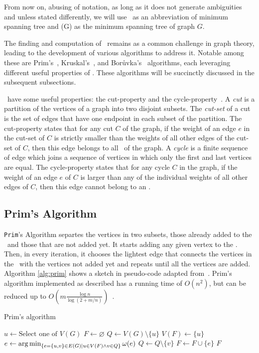 From now on, abusing of notation, as long as it does not generate ambiguities and unless stated differently, we will use \mst\ as an abbreviation of minimum spanning tree and \mst(G) as the minimum spanning tree of graph $G$.

The finding and computation of \msts\ remains as a common challenge in graph theory, leading to the development of various algorithms to address it. Notable among these are Prim's~\cite{Prim1957}, Kruskal's~\cite{Kruskal1956}, and Bor\r{u}vka's~\cite{Boruvka1926} algorithms, each leveraging different useful properties of \msts. These algorithms will be succinctly discussed in the subsequent subsections.

\msts\ have some useful properties: the cut-property and the cycle-property~\cite{TarjanDSandNA}. A \textit{cut} is a partition of the vertices of a graph into two disjoint subsets. The \textit{cut-set} of a cut is the set of edges that have one endpoint in each subset of the partition. The cut-property states that for any cut $C$ of the graph, if the weight of an edge $e$ in the cut-set of $C$ is strictly smaller than the weights of all other edges of the cut-set of $C$, then this edge belongs to all \msts\ of the graph. A \textit{cycle} is a finite sequence of edge which joins a sequence of vertices in which only the first and last vertices are equal. The cycle-property states that for any cycle $C$ in the graph, if the weight of an edge $e$ of $C$ is larger than any of the individual weights of all other edges of $C$, then this edge cannot belong to an \mst.

\subsection*{Prim's Algorithm \label{sec:prim}}

{\tt Prim}'s Algorithm separtes the vertices in two subsets, those already added to the \mst\ and those that are not added yet. It starts adding any given vertex to the \mst. Then, in every iteration, it chooses the lightest edge that connects the vertices in the \mst\ with the vertices not added yet and repeats until all the vertices are added. Algorithm \ref{alg:prim} shows a sketch in pseudo-code adapted from~\cite{TarjanDSandNA}. Prim's algorithm implemented as described has a running time of $O(n^2)$, but can be reduced up to $O(m \frac{\log n}{\log{(2 + m/n)}})$~\cite{TarjanDSandNA}.

\begin{algorithm}[H]
\caption{Prim's algorithm \label{alg:prim}}
\begin{algorithmic}
        \State $u \gets \text{Select one of }V(G)$
        \State $F \gets \varnothing$
        \State $Q \gets V(G) \setminus \{u\}$
        \State $V(F) \gets \{u\}$
            \State $e \gets \operatorname*{arg\,min}_{\{e=\{u,v\} \in E(G)  | u \in V(F) \land v \in Q \}} \omega(e)$
            \State $Q \gets Q \setminus \{ v \}$
            \State $F \gets F \cup \{e\}$
        \EndWhile
        \State \Return $F$
    \EndProcedure
\end{algorithmic}
\end{algorithm}


